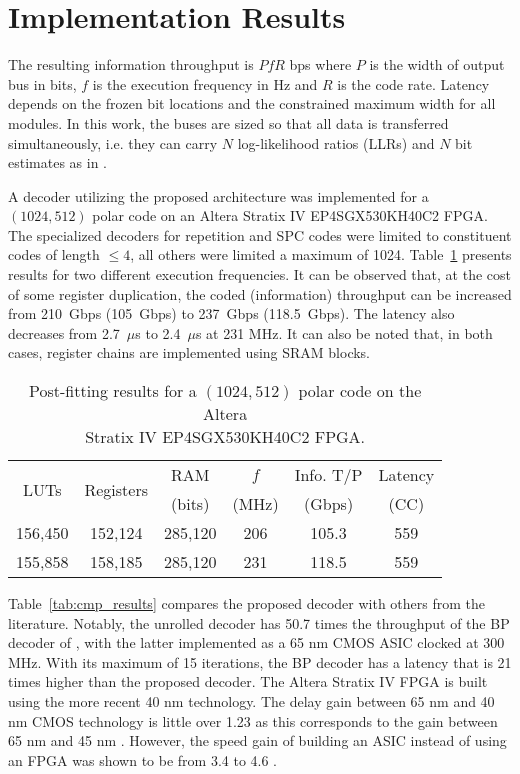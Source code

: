 \documentclass[letterpaper,onecolumn,journal,12pt]{IEEEtran}
\begin{document}
\pagebreak

\section{Implementation Results}

The resulting information throughput is $PfR$ bps where $P$ is the width of output bus in bits, $f$ is the execution frequency in Hz and $R$ is the code rate. Latency depends on the frozen bit locations and the constrained maximum width for all modules. In this work, the buses are sized so that all data is transferred simultaneously, i.e. they can carry $N$ log-likelihood ratios (LLRs) and $N$ bit estimates as in \cite{Park2014,Dizdar2014}.

A decoder utilizing the proposed architecture was implemented for a $(1024, 512)$ polar code on an Altera Stratix IV EP4SGX530KH40C2 FPGA. The specialized decoders for repetition and SPC codes were limited to constituent codes of length $\leq 4$, all others were limited a maximum of 1024. Table~\ref{tab:unrolled_results} presents results for two different execution frequencies. It can be observed that, at the cost of some register duplication, the coded (information) throughput can be increased from 210~Gbps (105~Gbps) to 237~Gbps (118.5~Gbps). The latency also decreases from 2.7~$\mu$s to 2.4~$\mu$s at 231 MHz. It can also be noted that, in both cases, register chains are implemented using SRAM blocks.

\begin{table}[h]
  \centering
  \caption{Post-fitting results for a $(1024,512)$ polar code on the Altera\\ Stratix IV EP4SGX530KH40C2 FPGA.}
  \begin{tabular}{c c c c c c}
    \toprule
    \multicolumn{1}{c}{\multirow{2}{*}{LUTs}} & \multicolumn{1}{c}{\multirow{2}{*}{Registers}} & \multicolumn{1}{c}{RAM} & $f$ & Info. T/P & Latency\\
    & & \multicolumn{1}{c}{(bits)} & (MHz) & (Gbps) & (CC)\\
    \midrule
    156,450 & 152,124 & 285,120 & 206 & 105.3 & 559\\
    155,858 & 158,185 & 285,120 & 231 & 118.5 & 559\\
    \bottomrule
  \end{tabular}
  \label{tab:unrolled_results}
\end{table}

Table~\ref{tab:cmp_results} compares the proposed decoder with others from the literature. Notably, the unrolled decoder has 50.7 times the throughput of the BP decoder of \cite{Park2014}, with the latter implemented as a 65 nm CMOS ASIC clocked at 300 MHz. With its maximum of 15 iterations, the BP decoder has a latency that is 21 times higher than the proposed decoder. The Altera Stratix IV FPGA is built using the more recent 40 nm technology. The delay gain between 65 nm and 40 nm CMOS technology is little over 1.23 as this corresponds to the gain between 65 nm and 45 nm \cite{Wong2011}. However, the speed gain of building an ASIC instead of using an FPGA was shown to be from 3.4 to 4.6 \cite{Kuon2007}.
\end{document}
